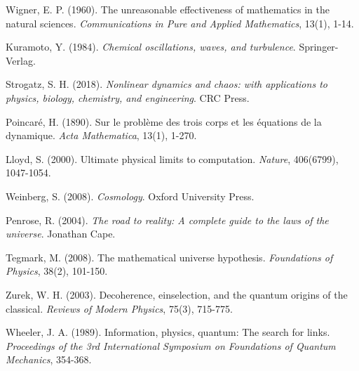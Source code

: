 \documentclass[11pt]{article}
\theoremstyle{remark}
\begin{document}
\begin{thebibliography}{99}

Wigner, E. P. (1960). The unreasonable effectiveness of mathematics in the natural sciences. \textit{Communications in Pure and Applied Mathematics}, 13(1), 1-14.

Kuramoto, Y. (1984). \textit{Chemical oscillations, waves, and turbulence}. Springer-Verlag.

Strogatz, S. H. (2018). \textit{Nonlinear dynamics and chaos: with applications to physics, biology, chemistry, and engineering}. CRC Press.

Poincaré, H. (1890). Sur le problème des trois corps et les équations de la dynamique. \textit{Acta Mathematica}, 13(1), 1-270.

Lloyd, S. (2000). Ultimate physical limits to computation. \textit{Nature}, 406(6799), 1047-1054.

Weinberg, S. (2008). \textit{Cosmology}. Oxford University Press.

Penrose, R. (2004). \textit{The road to reality: A complete guide to the laws of the universe}. Jonathan Cape.

Tegmark, M. (2008). The mathematical universe hypothesis. \textit{Foundations of Physics}, 38(2), 101-150.

Zurek, W. H. (2003). Decoherence, einselection, and the quantum origins of the classical. \textit{Reviews of Modern Physics}, 75(3), 715-775.

Wheeler, J. A. (1989). Information, physics, quantum: The search for links. \textit{Proceedings of the 3rd International Symposium on Foundations of Quantum Mechanics}, 354-368.

\end{thebibliography}
\end{document}
